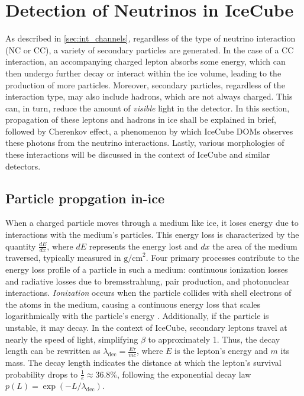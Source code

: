 \section{Detection of Neutrinos in IceCube}
\label{sec:nu_detcetion_ic}
As described in \ref{sec:int_channels}, regardless of the type of neutrino interaction (NC or CC), a variety of secondary particles are generated. In the case of a CC interaction, an accompanying charged lepton absorbs some energy, which can then undergo further decay or interact within the ice volume, leading to the production of more particles. Moreover, secondary particles, regardless of the interaction type, may also include hadrons, which are not always charged. This can, in turn, reduce the amount of \emph{visible} light in the detector. In this section, propagation of these leptons and hadrons in ice shall be explained in brief, followed by Cherenkov effect, a phenomenon by which IceCube DOMs observes these photons from the neutrino interactions. Lastly, various morphologies of these interactions will be discussed in the context of IceCube and similar detectors.

\subsection{Particle propgation in-ice}
\label{sec:particle_propgation}
When a charged particle moves through a medium like ice, it loses energy due to interactions with the medium's particles. This energy loss is characterized by the quantity $ \frac{dE}{dx} $, where $ dE $ represents the energy lost and $ dx $ the area of the medium traversed, typically measured in $\text{g/cm}^2$. Four primary processes contribute to the energy loss profile of a particle in such a medium: continuous ionization losses and radiative losses due to bremsstrahlung, pair production, and photonuclear interactions. \emph{Ionization} occurs when the particle collides with shell electrons of the atoms in the medium, causing a continuous energy loss that scales logarithmically with the particle's energy . Additionally, if the particle is unstable, it may decay. In the context of IceCube, secondary leptons travel at nearly the speed of light, simplifying $ \beta $ to approximately 1. Thus, the decay length can be rewritten as $ \lambda_{\text{dec}} = \frac{E\tau}{mc} $, where $ E $ is the lepton's energy and $ m $ its mass. The decay length indicates the distance at which the lepton's survival probability drops to $ \frac{1}{e} \approx 36.8\% $, following the exponential decay law $ p(L) = \exp(-L/\lambda_{\text{dec}}) $.

